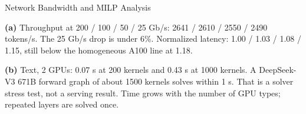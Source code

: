 \begin{frame}[t,label=mm_ts_net_01]{Network Bandwidth and MILP Analysis}

  \par
  \vspace{.02cm}
  {\centering{}\par}
  \vspace{.02cm}
  {\footnotesize\textbf{(a)} Throughput at 200 / 100 / 50 / 25 Gb/s: 2641 / 2610 / 2550 / 2490 tokens/s. The 25 Gb/s drop is under 6\%. Normalized latency: 1.00 / 1.03 / 1.08 / 1.15, still below the homogeneous A100 line at 1.18.}\par
  \vspace{.02cm}
  {\footnotesize\textbf{(b)} Text, 2 GPUs: 0.07 s at 200 kernels and 0.43 s at 1000 kernels. A DeepSeek-V3 671B forward graph of about 1500 kernels solves within 1 s. That is a solver stress test, not a serving result. Time grows with the number of GPU types; repeated layers are solved once.}\par
  \vspace{.08cm}
\end{frame}

